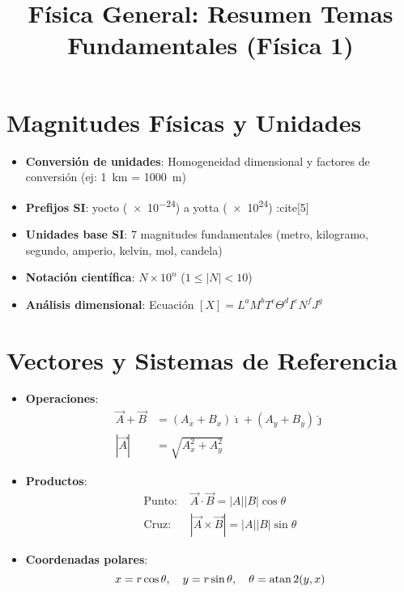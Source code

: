 \documentclass[12pt, a4paper, spanish]{article}
\title{\bfseries Física General: Resumen Temas Fundamentales (Física 1)}
\author{}
\date{}
\begin{document}
\maketitle

\section{Magnitudes Físicas y Unidades}
\begin{itemize}
    \item \textbf{Conversión de unidades}: Homogeneidad dimensional y factores de conversión (ej: \SI{1}{km} = \SI{1000}{m})
    \item \textbf{Prefijos SI}: yocto (\SI{e-24}{}) a yotta (\SI{e24}{}) :cite[5]
    \item \textbf{Unidades base SI}: 7 magnitudes fundamentales (metro, kilogramo, segundo, amperio, kelvin, mol, candela)
    \item \textbf{Notación científica}: $N \times 10^n$ ($1 \leq |N| < 10$)
    \item \textbf{Análisis dimensional}: Ecuación $[X] = L^a M^b T^c \Theta^d I^e N^f J^g$
\end{itemize}

\section{Vectores y Sistemas de Referencia}
\begin{itemize}
    \item \textbf{Operaciones}:
    \begin{align*}
    \vec{A} + \vec{B} &= (A_x + B_x)\hat{\imath} + (A_y + B_y)\hat{\jmath} \\
    |\vec{A}| &= \sqrt{A_x^2 + A_y^2}
    \end{align*}
    
    \item \textbf{Productos}:
    \begin{align*}
    \text{Punto: } &\vec{A} \cdot \vec{B} = |A||B|\cos\theta \\
    \text{Cruz: } &|\vec{A} \times \vec{B}| = |A||B|\sin\theta
    \end{align*}
    
    \item \textbf{Coordenadas polares}:
    \[
    x = r\cos\theta, \quad y = r\sin\theta, \quad \theta = \atan2(y,x)
    \]
\end{itemize}
\end{document}
